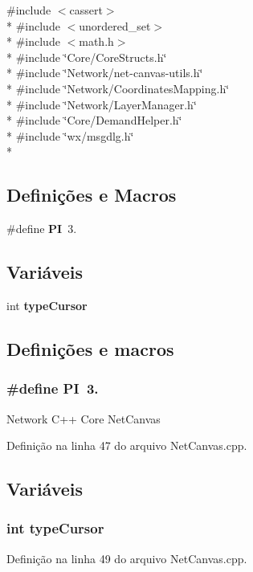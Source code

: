 {\ttfamily \#include $<$cassert$>$}\\*
{\ttfamily \#include $<$unordered\+\_\+set$>$}\\*
{\ttfamily \#include $<$math.\+h$>$}\\*
{\ttfamily \#include \char`\"{}Core/\+Core\+Structs.\+h\char`\"{}}\\*
{\ttfamily \#include \char`\"{}Network/net-\/canvas-\/utils.\+h\char`\"{}}\\*
{\ttfamily \#include \char`\"{}Network/\+Coordinates\+Mapping.\+h\char`\"{}}\\*
{\ttfamily \#include \char`\"{}Network/\+Layer\+Manager.\+h\char`\"{}}\\*
{\ttfamily \#include \char`\"{}Core/\+Demand\+Helper.\+h\char`\"{}}\\*
{\ttfamily \#include \char`\"{}wx/msgdlg.\+h\char`\"{}}\\*
\subsection*{Definições e Macros}
\begin{DoxyCompactItemize}
\item 
\#define {\bf PI}~3.
\end{DoxyCompactItemize}
\subsection*{Variáveis}
\begin{DoxyCompactItemize}
\item 
int {\bf type\+Cursor}
\end{DoxyCompactItemize}


\subsection{Definições e macros}
\subsubsection[{PI}]{\setlength{\rightskip}{0pt plus 5cm}\#define PI~3.}\label{_net_canvas_8cpp_a598a3330b3c21701223ee0ca14316eca}
Network C++ Core Net\+Canvas 

Definição na linha 47 do arquivo Net\+Canvas.\+cpp.



\subsection{Variáveis}
\subsubsection[{type\+Cursor}]{\setlength{\rightskip}{0pt plus 5cm}int type\+Cursor}\label{_net_canvas_8cpp_a89bebc706b62b752b67844837061bc2b}


Definição na linha 49 do arquivo Net\+Canvas.\+cpp.

